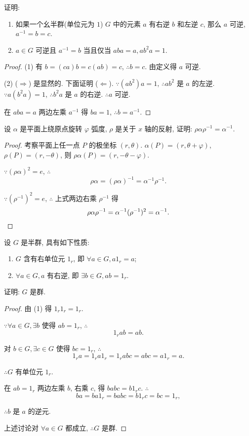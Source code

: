 \documentclass[color=black,device=normal,lang=cn,mode=geye]{elegantnote}
\begin{document}
\begin{exercisec}[5.2.5]\label{exc5.2.5}
    证明:
    \begin{enumerate}
        \def\labelenumi{(\arabic{enumi})}
        \item 如果一个幺半群(单位元为 $1$) $G$ 中的元素 $a$ 有右逆 $b$ 和左逆 $c$, 那么 $a$ 可逆, $a^{-1}=b=c$.
        \item $a\in G$ 可逆且 $a^{-1}=b$ 当且仅当 $aba=a,ab^2a=1$.
    \end{enumerate}
\end{exercisec}
\begin{proof}
    (1) 有 $b=(ca)b=c(ab)=c$, $\therefore b=c$. 由定义得 $a$ 可逆.

    (2) ($\Rightarrow$) 是显然的. 下面证明 ($\Leftarrow$). $\because(ab^2)a=1$, $\therefore ab^2$ 是 $a$ 的左逆. $\because a(b^2a)=1$, $\therefore b^2a$ 是 $a$ 的右逆. $\therefore a$ 可逆.
    
    在 $aba=a$ 两边左乘 $a^{-1}$ 得 $ba=1$, $\therefore b=a^{-1}$.
\end{proof}
\begin{exercisec}[5.2.6]
    设 $\alpha$ 是平面上绕原点旋转 $\varphi$ 弧度, $\rho$ 是关于 $x$ 轴的反射, 证明: $\rho\alpha\rho^{-1}=\alpha^{-1}$.
\end{exercisec}
\begin{proof}
    考察平面上任一点 $P$ 的极坐标 $(r,\theta)$. $\alpha(P)=(r,\theta+\varphi)$, $\rho(P)=(r,-\theta)$, 则 $\rho\alpha(P)=(r,-\theta-\varphi)$.

    $\because(\rho\alpha)^2=e$, $\therefore$
    \[\rho\alpha=(\rho\alpha)^{-1}=\alpha^{-1}\rho^{-1}.\]

    $\because(\rho^{-1})^2=e$, $\therefore$ 上式两边右乘 $\rho^{-1}$ 得
    \[\rho\alpha\rho^{-1}=\alpha^{-1}(\rho^{-1})^2=\alpha^{-1}.\qedhere\]
\end{proof}
\begin{exercisec}[5.2.8]
    设 $G$ 是半群, 具有如下性质:
    \begin{enumerate}
        \def\labelenumi{(\arabic{enumi})}
        \item $G$ 含有右单位元 $1_r$, 即 $\forall a\in G,a1_r=a$;
        \item $\forall a\in G,a$ 有右逆, 即 $\exists b\in G,ab=1_r$.
    \end{enumerate}

    证明: $G$ 是群.
\end{exercisec}
\begin{proof}
    由 (1) 得 $1_r1_r=1_r$.

    $\because\forall a\in G,\exists b$ 使得 $ab=1_r$, $\therefore$
    \[1_rab=ab.\]

    对 $b\in G,\exists c\in G$ 使得 $bc=1_r$, $\therefore$
    \[1_ra=1_ra1_r=1_rabc=abc=a1_r=a.\]

    $\therefore G$ 有单位元 $1_r$.

    在 $ab=1_r$ 两边左乘 $b$, 右乘 $c$, 得 $babc=b1_rc$. $\therefore$
    \[ba=ba1_r=babc=b1_rc=bc=1_r,\]

    $\therefore b$ 是 $a$ 的逆元.
    
    上述讨论对 $\forall a\in G$ 都成立, $\therefore G$ 是群.
\end{proof}
\end{document}
